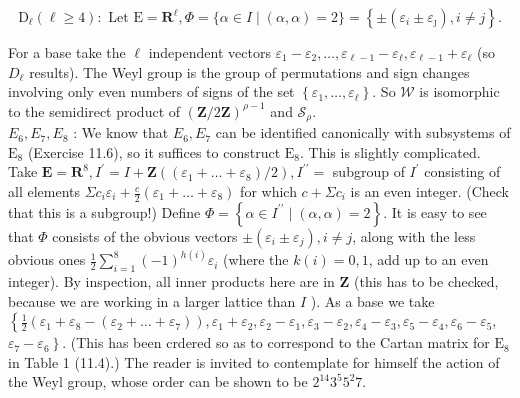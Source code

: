 \documentclass[10pt]{article}
\begin{document}
$$
\mathrm{D}_{\ell}(\ell \geq 4): \text { Let } \mathrm{E}=\mathbf{R}^{\ell}, \Phi=\{\alpha \in I \mid(\alpha, \alpha)=2\}=\left\{ \pm\left(\varepsilon_{i} \pm \varepsilon_{\jmath}\right), i \neq j\right\} .
$$

For a base take the $\ell$ independent vectors $\varepsilon_{1}-\varepsilon_{2}, \ldots, \varepsilon_{\ell-1}-\varepsilon_{\ell}, \varepsilon_{\ell-1}+\varepsilon_{\ell}$ (so $D_{\ell}$ results). The Weyl group is the group of permutations and sign changes\\
involving only even numbers of signs of the set $\left\{\varepsilon_{1}, \ldots, \varepsilon_{\ell}\right\}$. So $\mathscr{W}$ is isomorphic to the semidirect product of $(\mathbf{Z} / 2 \mathbf{Z})^{\rho-1}$ and $\mathscr{S}_{\rho}$.\\
$E_{6}, E_{7}, E_{8}$ : We know that $E_{6}, E_{7}$ can be identified canonically with subsystems of $\mathrm{E}_{8}$ (Exercise 11.6), so it suffices to construct $\mathrm{E}_{8}$. This is slightly complicated. Take $\mathbf{E}=\mathbf{R}^{8}, I^{\prime}=I+\mathbf{Z}\left(\left(\varepsilon_{1}+\ldots+\varepsilon_{8}\right) / 2\right), I^{\prime \prime}=$ subgroup of $I^{\prime}$ consisting of all elements $\Sigma c_{i} \varepsilon_{i}+\frac{c}{2}\left(\varepsilon_{1}+\ldots+\varepsilon_{8}\right)$ for which $c+\Sigma c_{i}$ is an even integer. (Check that this is a subgroup!) Define $\Phi=\left\{\alpha \in I^{\prime \prime} \mid(\alpha, \alpha)=2\right\}$. It is easy to see that $\Phi$ consists of the obvious vectors $\pm\left(\varepsilon_{i} \pm \varepsilon_{j}\right), i \neq j$, along with the less obvious ones $\frac{1}{2} \sum_{i=1}^{8}(-1)^{h(i)} \varepsilon_{i}$ (where the $k(i)=0,1$, add up to an even integer). By inspection, all inner products here are in $\mathbf{Z}$ (this has to be checked, because we are working in a larger lattice than $I$ ). As a base we take $\left\{\frac{1}{2}\left(\varepsilon_{1}+\varepsilon_{8}-\left(\varepsilon_{2}+\ldots+\varepsilon_{7}\right)\right), \varepsilon_{1}+\varepsilon_{2}, \varepsilon_{2}-\varepsilon_{1}, \varepsilon_{3}-\varepsilon_{2}, \varepsilon_{4}-\varepsilon_{3}, \varepsilon_{5}-\varepsilon_{4}, \varepsilon_{6}-\varepsilon_{5}\right.$, $\left.\varepsilon_{7}-\varepsilon_{6}\right\}$. (This has been crdered so as to correspond to the Cartan matrix for $\mathrm{E}_{8}$ in Table 1 (11.4).) The reader is invited to contemplate for himself the action of the Weyl group, whose order can be shown to be $2^{14} 3^{5} 5^{2} 7$.\\
\end{document}
